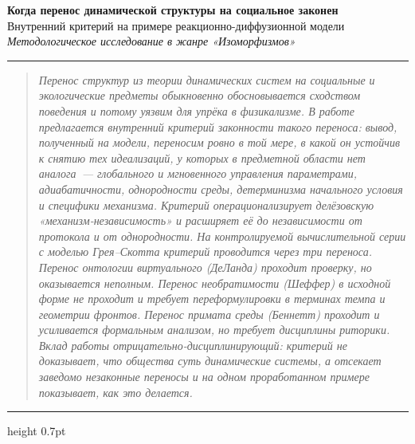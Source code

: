 \documentclass[11pt]{article}
\newcommand{\ruleline}{{\color{acmag!40}\hrule height 0.7pt}}
\begin{document}
\thispagestyle{fancy}
\begin{center}
{\sffamily\bfseries\fontsize{19}{24}\selectfont\color{acmag}
Когда перенос динамической структуры на социальное законен}\\[2mm]
{\sffamily\large\color{accyan}
Внутренний критерий на примере реакционно-диффузионной модели}\\[5mm]
{\itshape\color{acgrey}Методологическое исследование в жанре «Изоморфизмов»}\\[1mm]
{\small\color{acgrey}\rule{40mm}{0.4pt}}
\end{center}
\vspace{1mm}
\noindent\ruleline
\begin{quotation}\small\itshape\color{acink}
Перенос структур из теории динамических систем на социальные и экологические предметы обыкновенно
обосновывается сходством поведения и потому уязвим для упрёка в физикализме. В работе предлагается
\emph{внутренний} критерий законности такого переноса: вывод, полученный на модели, переносим ровно в той мере,
в какой он устойчив к снятию тех идеализаций, у которых в предметной области нет аналога~— глобального и
мгновенного управления параметрами, адиабатичности, однородности среды, детерминизма начального условия и
специфики механизма. Критерий операционализирует делёзовскую «механизм-независимость» и расширяет её до
независимости от протокола и от однородности. На контролируемой вычислительной серии с моделью Грея–Скотта
критерий проводится через три переноса. Перенос онтологии виртуального (ДеЛанда) проходит проверку, но
оказывается неполным. Перенос необратимости (Шеффер) в исходной форме не проходит и требует переформулировки в
терминах темпа и геометрии фронтов. Перенос примата среды (Беннетт) проходит и усиливается формальным анализом,
но требует дисциплины риторики. Вклад работы отрицательно-дисциплинирующий: критерий не доказывает, что общества
суть динамические системы, а отсекает заведомо незаконные переносы и на одном проработанном примере показывает,
как это делается.
\end{quotation}
\ruleline
\vspace{2mm}

\end{document}
